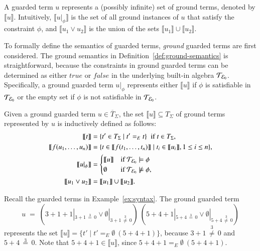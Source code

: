 A guarded term $u$ represents a (possibly infinite) set of ground
terms, denoted by $\llbracket u \rrbracket$.  Intuitively, $\llbracket
u |_\phi \rrbracket$ is the set of all ground instances of $u$ that
satisfy the constraint $\phi$, and $\llbracket u_1 \vee u_2 \rrbracket$ is the union
of the sets $\llbracket u_1 \rrbracket \cup \llbracket u_2
\rrbracket$.

To formally define the semantics of guarded terms, \emph{ground}
guarded terms are first considered.  The ground semantics in
Definition~\ref{def:ground-semantics} is straightforward, because the
constraints in ground guarded terms can be determined as either
$\mathit{true}$ or $\mathit{false}$ in the underlying built-in algebra
$\mathcal{T}_{\mathcal{E}_{0}}$.  Specifically, a ground guarded term $u |_\phi$ represents
either $\llbracket u \rrbracket$ if $\phi$ is satisfiable in $\mathcal{T}_{\mathcal{E}_{0}}$
or the empty set if $\phi$ is not satisfiable in $\mathcal{T}_{\mathcal{E}_{0}}$.

\begin{definition}\label{def:ground-semantics}
Given a ground guarded term $u \in \overline{T}_{\Sigma}$,
the set $\llbracket u \rrbracket \subseteq T_\Sigma$ of  ground terms represented by $u$ 
is inductively defined as follows:
\[
\begin{aligned}
\llbracket t \rrbracket &= \{t' \in T_\Sigma \mid t' =_E t\}\;\;\mbox{if $t \in {T}_{\Sigma}$},
\\
\llbracket f(u_1,\ldots,u_n) \rrbracket &=  \{t \in \llbracket f(t_1,\ldots,t_n)\rrbracket \mid  t_i \in \llbracket u_i\rrbracket, 1 \leq i \leq n  \},
\\
\llbracket u |_\phi \rrbracket &=
    \begin{cases}
    \llbracket u \rrbracket &\mbox{if}\ \mathcal{T}_{\mathcal{E}_{0}} \models \phi 
    \\
    \emptyset &\mbox{if}\ \mathcal{T}_{\mathcal{E}_{0}} \not \models \phi,
    \end{cases}
\\
\llbracket u_1  \vee u_2  \rrbracket &= \llbracket u_1 \rrbracket \cup \llbracket u_2 \rrbracket.
\end{aligned}
\]
\end{definition}


\begin{example}\label{ex:semantics-ground}
Recall the guarded terms in Example~\ref{ex:syntax}. The ground
guarded term
\[
u \;=\; (3 + 1 + 1 |_{3 + 1 \,\stackrel{3}{=}\, 0} \vee \emptyset |_{3 + 1 \,\stackrel{3}{\not=}\, 0})\ (5 + 4 + 1 |_{5 + 4 \,\stackrel{3}{=}\, 0} \vee \emptyset |_{5 + 4 \,\stackrel{3}{\not=}\, 0})
\]
represents the set $\llbracket u \rrbracket = \{t' \mid t' =_E
\emptyset\ (5 + 4 + 1)\}$, because $ 3 + 1
\,\stackrel{\scriptscriptstyle 3}{\not=}\, 0$ and $5 + 4
\,\stackrel{\scriptscriptstyle 3}{=}\, 0$.  Note that $5 + 4 + 1 \in
\llbracket u \rrbracket$, since $5 + 4 + 1 =_E \emptyset\ (5 + 4 +
1)$.
\end{example}

